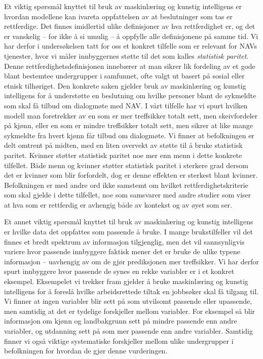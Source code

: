\documentclass[
]{book}
\begin{document}
Et viktig spørsmål knyttet til bruk av maskinlæring og kunstig intelligens er hvordan modellene kan ivareta oppfattelsen av at beslutninger som tas er rettferdige.
Det finnes imidlertid ulike definisjoner av hva rettferdighet er, og det er vanskelig -- for ikke å si umulig -- å oppfylle alle definisjonene på samme tid.
Vi har derfor i undersøkelsen tatt for oss et konkret tilfelle som er relevant for NAVs tjenester, hvor vi måler innbyggernes støtte til det som kalles \emph{statistisk paritet}.
Denne rettferdighetsdefinisjonen innebærer at man sikrer lik fordeling av et gode blant bestemtee undergrupper i samfunnet, ofte valgt ut basert på sosial eller etnisk tilhøriget.
Den konkrete saken gjelder bruk av maskinlæring og kunstig intelligens for å understøtte en beslutning om hvilke personer blant de sykmeldte som skal få tilbud om dialogmøte med NAV.
I vårt tilfelle har vi spurt hvilken modell man foretrekker av en som er mer treffsikker totalt sett, men skeivfordeler på kjønn, eller en som er mindre treffsikker totalt sett, men sikrer at like mange sykmeldte fra hvert kjønn får tilbud om dialogmøte.
Vi finner at befolkningen er delt omtrent på midten, med en liten overvekt av støtte til å bruke statistisk paritet.
Kvinner støtter statistisk paritet noe mer enn menn i dette konkrete tilfellet.
Både menn og kvinner støtter statistisk paritet i sterkere grad dersom det er kvinner som blir forfordelt, dog er denne effekten er sterkest blant kvinner.
Befolkningen er med andre ord ikke samstemt om hvilket rettferdighetskriterie som skal gjelde i dette tilfellet, noe som samsvarer med andre studier som viser at hva som er rettferdig er avhengig både av kontekst og av øyet som ser.

Et annet viktig spørsmål knyttet til bruk av maskinlæring og kunstig intelligens er hvilke data det oppfattes som passende å bruke.
I mange brukstilfeller vil det finnes et bredt spektrum av informasjon tilgjenglig, men det vil sannsynligvis variere hvor passende innbyggere faktisk mener det er bruke de ulike typene informasjon -- uavhengig av om de gjør prediksjonen mer treffsikker.
Vi har derfor spurt innbyggere hvor passende de synes en rekke variabler er i et konkret eksempel.
Eksempelet vi trekker fram gjelder å bruke maskinlæring og kunstig intelligens for å foreslå hvilke arbeidsrettede tiltak en jobbsøker skal få tilgang til.
Vi finner at ingen variabler blir sett på som utvilsomt passende eller upassende, men samtidig at det er tydelige forskjeller mellom variabler.
For eksempel så blir informasjon om kjønn og landbakgrunn sett på mindre passende enn andre variabler, og utdanning sett på som mer passende enn andre variabler.
Samtidig finner vi også viktige systematiske forskjeller mellom ulike undergrupper i befolkningen for hvordan de gjør denne vurderingen.
\end{document}
